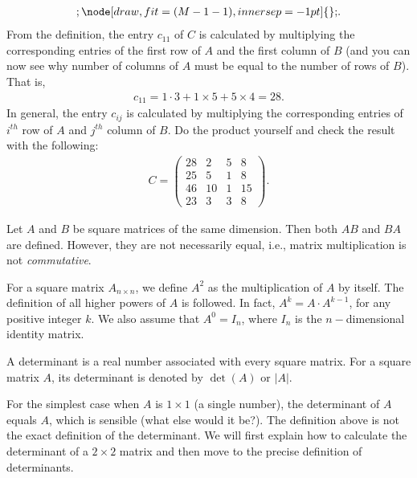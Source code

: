 \documentclass{subfile}
\begin{document}
\begin{example}
\begin{align*}
{{					};
					\node[draw,fit=(M-1-1),inner sep=-1pt] {};
				}
				.
				\end{align*}
			From the definition, the entry $c_{11}$ of $C$ is calculated by multiplying the corresponding entries of the first row of $A$ and the first column of $B$ (and you can now see why number of columns of $A$ must be equal to the number of rows of $B$). That is,
				\begin{align*}
					c_{11}=1 \cdot 3 + 1 \times 5 + 5 \times 4 = 28.
				\end{align*}
			In general, the entry $c_{ij}$ is calculated by multiplying the corresponding entries of $i^{th}$ row of $A$ and $j^{th}$ column of $B$. Do the product yourself and check the result with the following:
			\begin{align*}
			C = \begin{pmatrix}
				{28}&2&5&8\\
				{25}&5&1&8\\
				{46}&{10}&1&{15}\\
				{23}&3&3&8
				\end{pmatrix}.
			\end{align*}
	\end{example}
	
	\begin{note}
		Let $A$ and $B$ be square matrices of the same dimension. Then both $AB$ and $BA$ are defined. However, they are not necessarily equal, i.e., matrix multiplication is not \textit{commutative}.
	\end{note}
	
	
	\begin{definition}
		For a square matrix $A_{n\times n}$, we define $A^2$ as the multiplication of $A$ by itself. The definition of all higher powers of $A$ is followed. In fact, $A^k=A \cdot A^{k-1}$, for any positive integer $k$. We also assume that $A^{0}=I_n$, where $I_n$ is the $n-$dimensional identity matrix.
	\end{definition}
	
	\begin{definition}
		A determinant is a real number associated with every square matrix. For a square matrix $A$, its determinant is denoted by $\det(A)$ or $|A|$.
	\end{definition}
	
For the simplest case when $A$ is $1\times 1$ (a single number), the determinant of $A$ equals $A$, which is sensible (what else would it be?). The definition above is not the exact definition of the determinant. We will first explain how to calculate the determinant of a $2\times 2$ matrix and then move to the precise definition of determinants.
\end{document}
